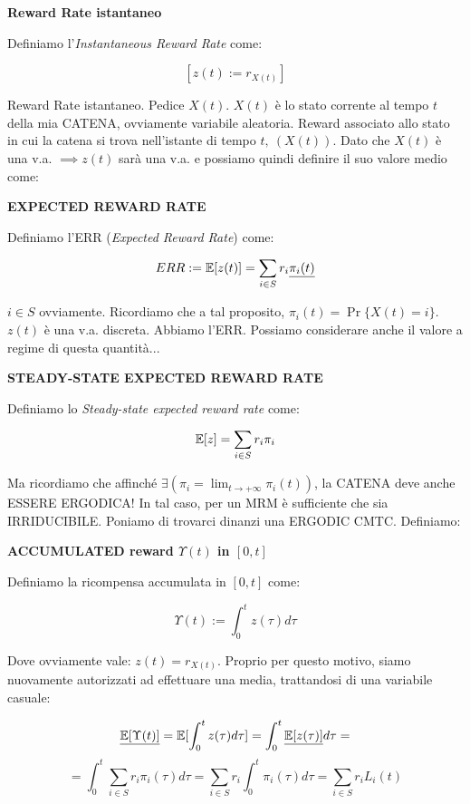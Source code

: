 \begin{defn}{\textbf{Reward Rate istantaneo}}

Definiamo l'\textit{Instantaneous Reward Rate} come:

\[
	[z(t) := r_{X(t)}]
\]

\end{defn}

Reward Rate istantaneo. Pedice $X(t)$. $X(t)$ è lo stato corrente al tempo $t$ della mia CATENA, ovviamente variabile aleatoria. Reward associato allo stato in cui la catena si trova nell'istante di tempo $t,\ (X(t))$. Dato che $X(t)$ è una v.a. $\implies z(t)$ sarà una v.a. e possiamo quindi definire il suo valore medio come:

\begin{defn}{\textbf{EXPECTED REWARD RATE}}

Definiamo l'ERR (\textit{Expected Reward Rate}) come:

\[
	ERR := \operatorname{\mathbb{E}}[z(t)] = \sum_{i\in S}{r_i\underline{\pi_i(t)}}
\]
\end{defn}

$i\in S$ ovviamente. Ricordiamo che a tal proposito, $\pi_i(t) = \Pr\{X(t)=i\}$. $z(t)$ è una v.a. discreta. Abbiamo l'ERR. Possiamo considerare anche il valore a regime di questa quantità...

\begin{defn}{\textbf{STEADY-STATE EXPECTED REWARD RATE}}

Definiamo lo \textit{Steady-state expected reward rate} come:

\[	
	\operatorname{\mathbb{E}}[z] = \sum_{i\in S}{r_i\pi_i}
\]
\end{defn}

Ma ricordiamo che affinché $\exists(\pi_i = \lim_{t\to +\infty}{\pi_i(t)})$, la CATENA deve anche ESSERE ERGODICA! In tal caso, per un MRM è sufficiente che sia IRRIDUCIBILE. Poniamo di trovarci dinanzi una ERGODIC CMTC. Definiamo:

\begin{defn}{\textbf{ACCUMULATED reward $\Upsilon(t)$ in $[0,t]$}}

Definiamo la ricompensa accumulata in $[0,t]$ come:

\[
	\Upsilon(t) := \int_0^t{z(\tau)d\tau}
\]
\end{defn}

Dove ovviamente vale: $z(t)=r_{X(t)}$. Proprio per questo motivo, siamo nuovamente autorizzati ad effettuare una media, trattandosi di una variabile casuale:

\[
	\underline{\operatorname{\mathbb{E}}[\Upsilon(t)]} = \operatorname{\mathbb{E}}[\int_0^t{z(\tau)d\tau}] = \int_0^t{\underline{\operatorname{\mathbb{E}}[z(\tau)]}d\tau} =
\]
\[
	= \int_0^t{\sum_{i\in S}{r_i\pi_i(\tau)}d\tau} = \sum_{i\in S}{r_i\int_0^t{\pi_i(\tau)d\tau}} = \sum_{i\in S}{r_iL_i(t)}
\]

